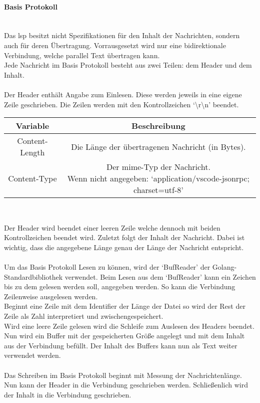 \documentclass[./einleitung.tex]{subfiles}
\begin{document}
    \paragraph{Basis Protokoll}\mbox{}\\
    Das \acrshort{lsp} besitzt nicht Spezifikationen für den Inhalt der Nachrichten, sondern auch für deren Übertragung.
    Vorrausgesetzt wird nur eine bidirektionale Verbindung, welche parallel Text übertragen kann.\\
    Jede Nachricht im Basis Protokoll besteht aus zwei Teilen: dem Header und dem Inhalt.
    \\\\
    Der Header enthält Angabe zum Einlesen.
    Diese werden jeweils in eine eigene Zeile geschrieben.
    Die Zeilen werden mit den Kontrollzeichen `{\textbackslash}r{\textbackslash}n' beendet.
    \begin{center}
        \begin{tabular}{|c|c|}
            \hline
            Variable & Beschreibung \\
            \hline
            \hline
            Content-Length & Die Länge der übertragenen Nachricht (in Bytes).\\
            \hline
            Content-Type & \makecell{Der \acrshort{mime}-Typ der Nachricht.\\
            Wenn nicht angegeben: `application/vscode-jsonrpc; charset=utf-8'}\\
            \hline
        \end{tabular}
        \\
        \cite{header}
    \end{center}
    Der Header wird beendet einer leeren Zeile welche dennoch mit beiden Kontrollzeichen beendet wird.
    Zuletzt folgt der Inhalt der Nachricht.
    Dabei ist wichtig, dass die angegebene Länge genau der Länge der Nachricht entspricht.
    \\\\
    Um das Basis Protokoll Lesen zu können, wird der `BufReader' der Golang-Standardbibliothek verwendet.
    Beim Lesen aus dem `BufReader' kann ein Zeichen bis zu dem gelesen werden soll, angegeben werden.
    So kann die Verbindung Zeilenweise ausgelesen werden.\\
    Beginnt eine Zeile mit dem Identifier der Länge der Datei so wird der Rest der Zeile als Zahl interpretiert und zwischengespeichert.\\
    Wird eine leere Zeile gelesen wird die Schleife zum Auslesen des Headers beendet.\\
    Nun wird ein Buffer mit der gespeicherten Größe angelegt und mit dem Inhalt aus der Verbindung befüllt.
    Der Inhalt des Buffers kann nun als Text weiter verwendet werden.
    \\\\
    Das Schreiben im Basis Protokoll beginnt mit Messung der Nachrichtenlänge.
    Nun kann der Header in die Verbindung geschrieben werden.
    Schließenlich wird der Inhalt in die Verbindung geschrieben.
\end{document}
